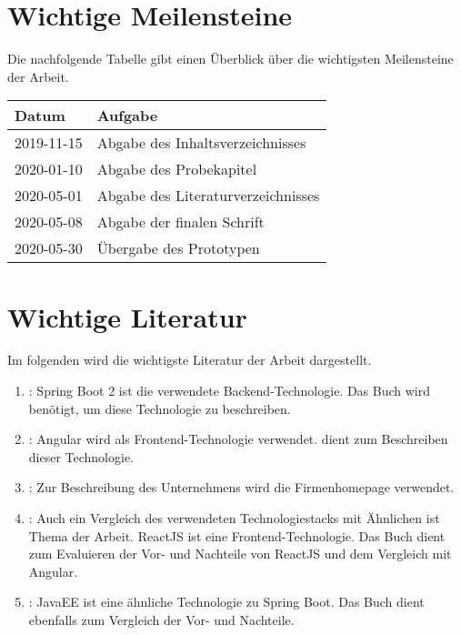 \documentclass[master,german]{hgbthesis}
\begin{document}
\section{Wichtige Meilensteine}
Die nachfolgende Tabelle gibt einen Überblick über die wichtigsten Meilensteine der Arbeit.
\begin{table}[H]
		\begin{tabular}{ll}
			\hline
			\multicolumn{1}{|l|}{Datum} & \multicolumn{1}{l|}{Aufgabe} \\ \hline
			\multicolumn{1}{|l|}{2019-11-15} & \multicolumn{1}{l|}{Abgabe des Inhaltsverzeichnisses} \\ \hline
			\multicolumn{1}{|l|}{2020-01-10} & \multicolumn{1}{l|}{Abgabe des Probekapitel} \\ \hline
			\multicolumn{1}{|l|}{2020-05-01} & \multicolumn{1}{l|}{Abgabe des Literaturverzeichnisses} \\ \hline
			\multicolumn{1}{|l|}{2020-05-08} & \multicolumn{1}{l|}{Abgabe der finalen Schrift} \\ \hline
			\multicolumn{1}{|l|}{2020-05-30} & \multicolumn{1}{l|}{Übergabe des Prototypen} \\ \hline
		\end{tabular}%

\end{table}

\section{Wichtige Literatur}
Im folgenden wird die wichtigste Literatur der Arbeit dargestellt.
\begin{enumerate}
	\item \cite{SpringBoot2}: Spring Boot 2 ist die verwendete Backend-Technologie. Das Buch  wird benötigt, um diese Technologie zu beschreiben.
	\item \cite{ProAngular6}: Angular wird als Frontend-Technologie verwendet.  dient zum Beschreiben dieser Technologie.
	\item \cite{3BankenIT}: Zur Beschreibung des Unternehmens wird die Firmenhomepage verwendet. 
	\item \cite{FullStackReact}: Auch ein Vergleich des verwendeten Technologiestacks mit Ähnlichen ist Thema der Arbeit. ReactJS ist eine Frontend-Technologie. Das Buch  dient zum Evaluieren der Vor- und Nachteile von ReactJS und dem Vergleich mit Angular.
	\item \cite{JavaEE}: JavaEE ist eine ähnliche Technologie zu Spring Boot. Das Buch  dient ebenfalls zum Vergleich der Vor- und Nachteile.
\end{enumerate}

\MakeBibliography                     				%
%

\end{document}
